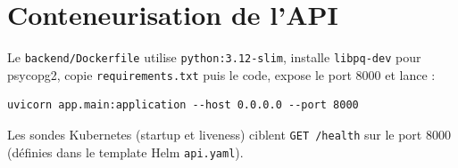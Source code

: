 \section{Conteneurisation de l'API}

Le \texttt{backend/Dockerfile} utilise \texttt{python:3.12-slim}, installe \texttt{libpq-dev} pour psycopg2, copie \texttt{requirements.txt} puis le code, expose le port 8000 et lance :

\begin{lstlisting}[style=bash]
uvicorn app.main:application --host 0.0.0.0 --port 8000
\end{lstlisting}

Les sondes Kubernetes (startup et liveness) ciblent \texttt{GET /health} sur le port 8000 (définies dans le template Helm \texttt{api.yaml}).
